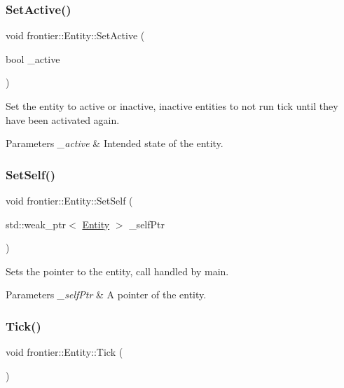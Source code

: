 \subsubsection{\texorpdfstring{Set\+Active()}{SetActive()}}
{\footnotesize\ttfamily void frontier\+::\+Entity\+::\+Set\+Active (\begin{DoxyParamCaption}\item[{bool}]{\+\_\+active }\end{DoxyParamCaption})}



Set the entity to active or inactive, inactive entities to not run tick until they have been activated again. 


\begin{DoxyParams}{Parameters}
{\em \+\_\+active} & Intended state of the entity. \\
\hline
\end{DoxyParams}
\mbox{\label{classfrontier_1_1_entity_a431409dd431097a4c523cb6cc83edb0c}} 
\subsubsection{\texorpdfstring{Set\+Self()}{SetSelf()}}
{\footnotesize\ttfamily void frontier\+::\+Entity\+::\+Set\+Self (\begin{DoxyParamCaption}\item[{std\+::weak\+\_\+ptr$<$ \hyperlink{classfrontier_1_1_entity}{Entity} $>$}]{\+\_\+self\+Ptr }\end{DoxyParamCaption})}



Sets the pointer to the entity, call handled by main. 


\begin{DoxyParams}{Parameters}
{\em \+\_\+self\+Ptr} & A pointer of the entity. \\
\hline
\end{DoxyParams}
\mbox{\label{classfrontier_1_1_entity_a9f8063271fecd3ff15cfb2f3d6afa2e4}} 
\subsubsection{\texorpdfstring{Tick()}{Tick()}}
{\footnotesize\ttfamily void frontier\+::\+Entity\+::\+Tick (\begin{DoxyParamCaption}{ }\end{DoxyParamCaption})}




